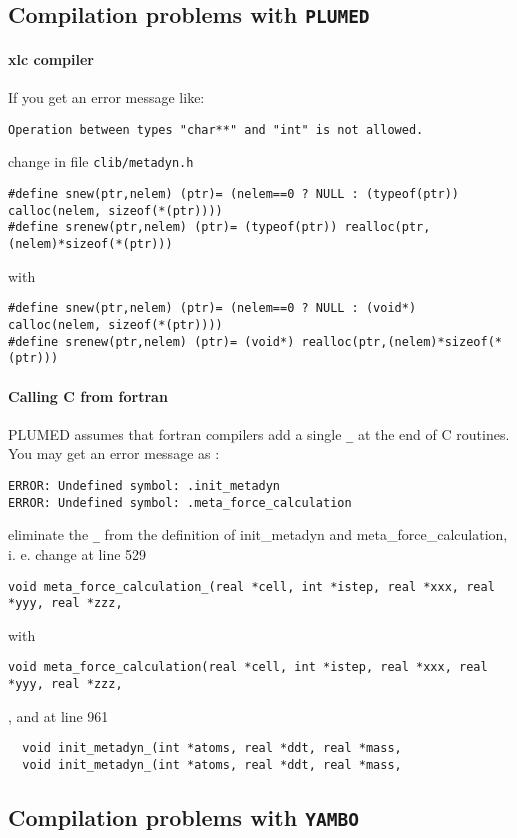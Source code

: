 \documentclass[12pt,a4paper]{article}
\begin{document}
\subsection{Compilation problems with \texttt{PLUMED}}

\paragraph{xlc compiler}
If you get an error message like:
\begin{verbatim}
Operation between types "char**" and "int" is not allowed.
\end{verbatim}
change in file \texttt{clib/metadyn.h}
\begin{verbatim}
#define snew(ptr,nelem) (ptr)= (nelem==0 ? NULL : (typeof(ptr)) calloc(nelem, sizeof(*(ptr))))
#define srenew(ptr,nelem) (ptr)= (typeof(ptr)) realloc(ptr,(nelem)*sizeof(*(ptr)))
\end{verbatim}
with
\begin{verbatim}
#define snew(ptr,nelem) (ptr)= (nelem==0 ? NULL : (void*) calloc(nelem, sizeof(*(ptr))))
#define srenew(ptr,nelem) (ptr)= (void*) realloc(ptr,(nelem)*sizeof(*(ptr)))
\end{verbatim}

\paragraph{Calling C from fortran}
PLUMED assumes that fortran compilers add a single \texttt{\_} at the end of C routines. You
may get an error message as :
\begin{verbatim}
ERROR: Undefined symbol: .init_metadyn
ERROR: Undefined symbol: .meta_force_calculation
\end{verbatim}
eliminate the \texttt{\_} from the definition of init\_metadyn and meta\_force\_calculation, i. e.
change at line 529
\begin{verbatim}
void meta_force_calculation_(real *cell, int *istep, real *xxx, real *yyy, real *zzz, 
\end{verbatim}
with
\begin{verbatim}
void meta_force_calculation(real *cell, int *istep, real *xxx, real *yyy, real *zzz,    
\end{verbatim},
and at line 961
\begin{verbatim}
  void init_metadyn_(int *atoms, real *ddt, real *mass, 
  void init_metadyn_(int *atoms, real *ddt, real *mass, 
\end{verbatim}
\subsection{Compilation problems with \texttt{YAMBO}}
\end{document}
